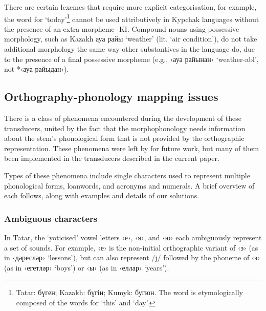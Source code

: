\documentclass[a4paper,11pt,twocolumn]{article}
\newcommand{\gmk}[1]{{\qgmk #1}}
\begin{document}
There are certain lexemes that require more explicit categorisation, for example, the word 
for `today'\footnote{Tatar: бүген; Kazakh: бүгін; Kumyk: бугюн. The word is etymologically composed of the words for `this' and `day'.} 
cannot be used attributively in Kypchak languages without the presence of an extra morpheme -KI. Compound nouns
using possessive morphology, such as Kazakh ауа райы `weather' (lit. `air condition'), do not take additional morphology the same way other substantives in the language do, due to the presence of a final possessive morpheme (e.g., ‹ауа райынан› `weather-\gmk{abl}', not *‹ауа райыдан›). %


\subsection{Orthography-phonology mapping issues}

There is a class of phenomena encountered during the development of these transducers, united by the fact that the morphophonology needs information about the stem's phonological form that is not provided by the orthographic representation.  These phenomena were left by \citet{washington2012} for future work, but many of them been implemented in the transducers described in the current paper.

Types of these phenomena include single characters used to represent multiple phonological forms, loanwords, and acronyms and numerals.  A brief overview of each follows, along with examples and details of our solutions.

\subsubsection{Ambiguous characters}
In Tatar, the `yoticised' vowel letters ‹е›, ‹я›, and ‹ю› each ambiguously represent a set of sounds.  For example, ‹е› is the non-initial orthographic variant of ‹э› (as in ‹дәресләр› `lessons'), but can also represent /j/ followed by the phoneme of ‹э› (as in ‹егетләр› `boys') or ‹ы› (as in ‹еллар› `years').
\end{document}
